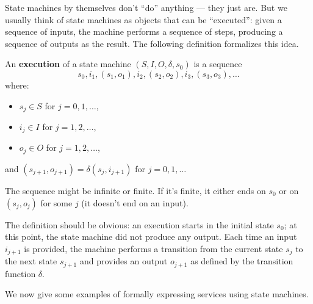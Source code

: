 \documentclass[12pt,a4paper,en]{pracamgr}
\newcommand{\tb}[1]{\textbf{#1}}
\begin{document}
State machines by themselves don't ``do'' anything --- they just are. But we usually think of state machines as objects that can be ``executed'': given a sequence of inputs, the machine performs a sequence of steps, producing a sequence of outputs as the result. The following definition formalizes this idea.

\begin{defin}
	An \tb{execution} of a state machine $(S, I, O, \delta, s_0)$ is a sequence
	$$ s_0, i_1, (s_1, o_1), i_2, (s_2, o_2), i_3, (s_3, o_3), \dots $$
	where:
	\begin{itemize}
		\item $s_j \in S$ for $j = 0, 1, \dots$,
		\item $i_j \in I$ for $j = 1, 2, \dots$,
		\item $o_j \in O$ for $j = 1, 2, \dots$,
	\end{itemize}
	and $(s_{j+1}, o_{j+1}) = \delta(s_j, i_{j+1})$ for $j = 0, 1, \dots$

	The sequence might be infinite or finite. If it's finite, it either ends on $s_0$ or on $(s_j, o_j)$ for some $j$ (it doesn't end on an input).
\end{defin}

The definition should be obvious: an execution starts in the initial state $s_0$; at this point, the state machine did not produce any output. Each time an input $i_{j+1}$ is provided, the machine performs a transition from the current state $s_j$ to the next state $s_{j+1}$ and provides an output $o_{j+1}$ as defined by the transition function $\delta$.

We now give some examples of formally expressing services using state machines.
\end{document}

